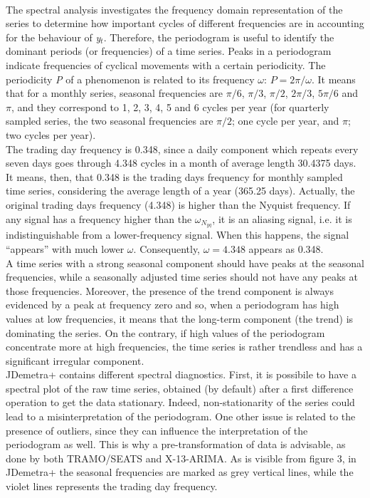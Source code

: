 \documentclass{article}
\begin{document}
\\The spectral analysis investigates the frequency domain representation of the series to determine how important cycles of different frequencies are in accounting for the behaviour of \textit{y$_t$}. Therefore, the periodogram is useful to identify the dominant periods (or frequencies) of a time series. Peaks in a periodogram indicate frequencies of cyclical movements with a certain periodicity. The periodicity \textit{P} of a phenomenon is related to its frequency $\omega$: $P=2 \pi / \omega$. It means that for a monthly series, seasonal frequencies are $\pi/6$, $\pi/3$, $\pi/2$, $2\pi/3$, $5\pi/6$ and $\pi$, and they correspond to 1, 2, 3, 4, 5 and 6 cycles per year (for quarterly sampled series, the two seasonal frequencies are $\pi/2$; one cycle per year, and $\pi$; two cycles per year).\\The trading day frequency is 0.348, since a daily component which repeats every seven days goes through 4.348 cycles in a month of average length 30.4375 days. It means, then, that 0.348 is the trading days frequency for monthly sampled time series, considering the average length of a year (365.25 days). Actually, the original trading days frequency (4.348) is higher than the Nyquist frequency. If any signal has a frequency higher than the $\omega_{N_{yq}}$, it is an aliasing signal, i.e. it is indistinguishable from a lower-frequency signal. When this happens, the signal “appears” with much lower $\omega$. Consequently, $\omega=4.348$ appears as 0.348.\\A time series with a strong seasonal component should have peaks at the seasonal frequencies, while a seasonally adjusted time series should not have any peaks at those frequencies. Moreover, the presence of the trend component is always evidenced by a peak at frequency zero and so, when a periodogram has high values at low frequencies, it means that the long-term component (the trend) is dominating the series. On the contrary, if high values of the periodogram concentrate more at high frequencies, the time series is rather trendless and has a significant irregular component.\\JDemetra+ contains different spectral diagnostics. First, it is possibile to have a spectral plot of the raw time series, obtained (by default) after a first difference operation to get the data stationary. Indeed, non-stationarity of the series could lead to a misinterpretation of the periodogram.  One other issue is related to the presence of outliers, since they can influence the interpretation of the periodogram as well. This is why a pre-transformation of data is advisable, as done by both TRAMO/SEATS and X-13-ARIMA.  As is visible from figure 3, in JDemetra+ the seasonal frequencies are marked as grey vertical lines, while the violet lines represents the trading day frequency.\\
\end{document}
